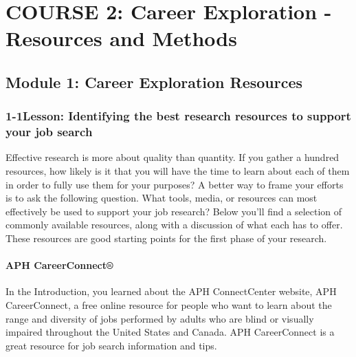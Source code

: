 \hypertarget{course2}{}\chapter*{COURSE 2: Career Exploration - Resources and Methods}\label{course2}
\noindent\makebox[\linewidth]{\rule{\linewidth}{0.4pt}}
\localtableofcontents 
\noindent\makebox[\textwidth]{\rule{\linewidth}{0.4pt}} 
\newpage
\pagebreak \section*{Module 1: Career Exploration Resources}
\noindent\makebox[\textwidth]{\rule{\linewidth}{0.4pt}} 
\localtableofcontents 
\noindent\makebox[\textwidth]{\rule{\linewidth}{0.4pt}} 


\pagebreak \subsection*{1-1\quad Lesson: Identifying the best research resources to support your job search}
Effective research is more about quality than quantity. If you gather a hundred resources, how likely is it that you will have the time to learn about each of them in order to fully use them for your purposes? A better way to frame your efforts is to ask the following question. What tools, media, or resources can most effectively be used to support your job research? Below you'll find a selection of commonly available resources, along with a discussion of what each has to offer. These resources are good starting points for the first phase of your research.
\subsubsection*{APH CareerConnect®}
In the Introduction, you learned about the APH ConnectCenter website, APH CareerConnect, a free online resource for people who want to learn about the range and diversity of jobs performed by adults who are blind or visually impaired throughout the United States and Canada. APH CareerConnect is a great resource for job search information and tips.
